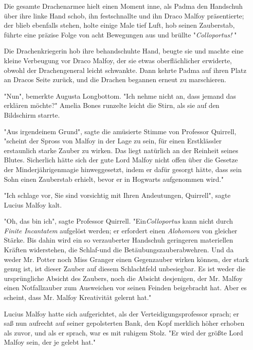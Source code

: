{Die gesamte Drachenarmee hielt einen Moment inne, als Padma den Handschuh über ihre linke Hand schob, ihn festschnallte und ihn Draco Malfoy präsentierte; der blieb ebenfalls stehen, holte einige Male tief Luft, hob seinen Zauberstab, führte eine präzise Folge von acht Bewegungen aus und brüllte "\emph{Colloportus!} "

Die Drachenkriegerin hob ihre behandschuhte Hand, beugte sie und machte eine kleine Verbeugung vor Draco Malfoy, der sie etwas oberflächlicher erwiderte, obwohl der Drachengeneral leicht schwankte. Dann kehrte Padma auf ihren Platz an Dracos Seite zurück, und die Drachen begannen erneut zu marschieren.

"Nun", bemerkte Augusta Longbottom. "Ich nehme nicht an, dass jemand das erklären möchte?" Amelia Bones runzelte leicht die Stirn, als sie auf den Bildschirm starrte.

"Aus irgendeinem Grund", sagte die amüsierte Stimme von Professor Quirrell, "scheint der Spross von Malfoy in der Lage zu sein, für einen Erstklässler erstaunlich starke Zauber zu wirken. Das liegt natürlich an der Reinheit seines Blutes. Sicherlich hätte sich der gute Lord Malfoy nicht offen über die Gesetze der Minderjährigenmagie hinweggesetzt, indem er dafür gesorgt hätte, dass sein Sohn einen Zauberstab erhielt, bevor er in Hogwarts aufgenommen wird."

"Ich schlage vor, Sie sind vorsichtig mit Ihren Andeutungen, Quirrell", sagte Lucius Malfoy kalt.

"Oh, das bin ich", sagte Professor Quirrell. "Ein\emph{Colloportus} kann nicht durch \emph{Finite Incantatem} aufgelöst werden; er erfordert einen \emph{Alohomora} von gleicher Stärke. Bis dahin wird ein so verzauberter Handschuh geringeren materiellen Kräften widerstehen, die Schlaf-und die Betäubungszauberabwehren. Und da weder Mr. Potter noch Miss Granger einen Gegenzauber wirken können, der stark genug ist, ist dieser Zauber auf diesem Schlachtfeld unbesiegbar. Es ist weder die ursprüngliche Absicht des Zaubers, noch die Absicht desjenigen, der Mr. Malfoy einen Notfallzauber zum Ausweichen vor seinen Feinden beigebracht hat. Aber es scheint, dass Mr. Malfoy Kreativität gelernt hat."

Lucius Malfoy hatte sich aufgerichtet, als der Verteidigungsprofessor sprach; er saß nun aufrecht auf seiner gepolsterten Bank, den Kopf merklich höher erhoben als zuvor, und als er sprach, war es mit ruhigem Stolz. "Er wird der größte Lord Malfoy sein, der je gelebt hat."

}
